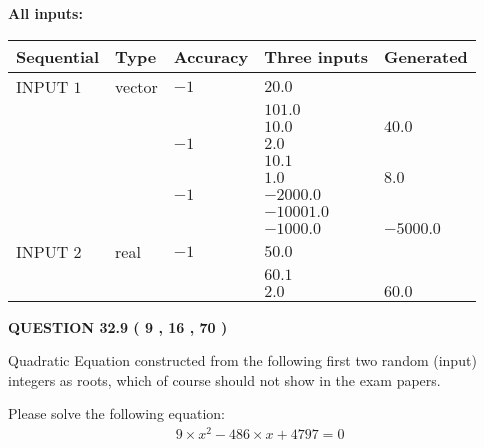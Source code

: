 \documentclass[12pt]{article}
\begin{document}
   
   
   
\noindent\vspace{0.1in}\hspace{-0.08in} {\textbf{\Large{All inputs: }}}
   
   
  
  
\noindent\begin{tabular}{|l|l|l|l|l|}
\hline
 Sequential & Type & Accuracy & Three inputs & Generated \\ 
\hline
 
 
  INPUT $            1 $ & vector & $           -1  $ & $
20.0
  $ & \\
  & & & $
101.0
  $ & \\
  & & & $
10.0
$ & $ 40.0 $ 
  \\
  & & $           -1  $ & $
2.0
  $ & \\
  & & & $
10.1
  $ & \\
  & & & $
1.0
$ & $ 8.0 $ 
  \\
  & & $           -1  $ & $
-2000.0
  $ & \\
  & & & $
-10001.0
  $ & \\
  & & & $
-1000.0
$ & $ -5000.0 $ 
 \\  \hline  
 
 
  INPUT $            2 $ & real & $           -1  $ & $
 50.0
  $ & \\
  & & &  $
 60.1
  $ & \\
  & & &  $
 2.0
 $ & $ 60.0 $ 
 \\  \hline  
 \end{tabular}
   
   
  
\vspace{0.2in}
  
{\textbf{\Large{QUESTION
32.9 
 (           9 ,          16 ,          70 )
}}}
  
  


\noindent{}
Quadratic Equation constructed from the following first two random (input) integers as roots,  
which of course should not show in the exam papers.  
\noindent{}


 
 

 
Please solve the following equation:
\begin{eqnarray*}
9 \times x^2  %
-486
                 \times x    %
+  %
4797 =0
\end{eqnarray*}
 
\end{document}

